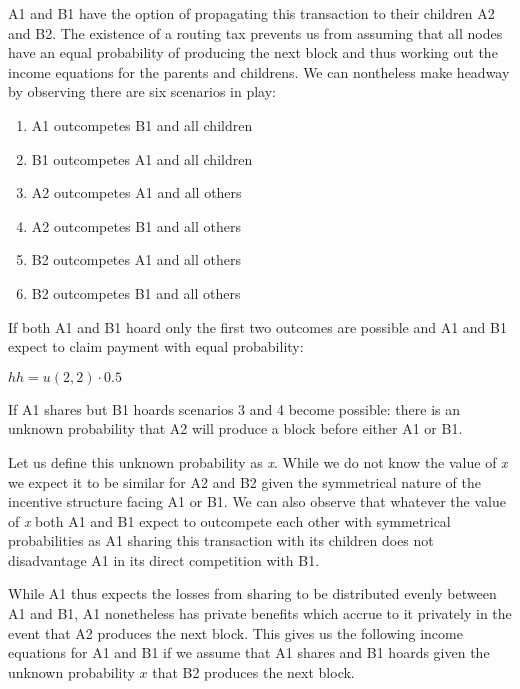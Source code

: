 \documentclass[oneside]{article}   	%
\begin{document}
\begin{multicols}{2}
A1 and B1 have the option of propagating this transaction to their children A2 and B2. The existence of a routing tax prevents us from assuming that all nodes have an equal probability of producing the next block and thus working out the income equations for the parents and childrens. We can nontheless make headway by observing there are six scenarios in play:

\begin{enumerate}
  \item A1 outcompetes B1 and all children
  \item B1 outcompetes A1 and all children
  \item A2 outcompetes A1 and all others
  \item A2 outcompetes B1 and all others
  \item B2 outcompetes A1 and all others
  \item B2 outcompetes B1 and all others
\end{enumerate}

If both A1 and B1 hoard only the first two outcomes are possible and A1 and B1 expect to claim payment with equal probability:

\large
\begin{adjustwidth}{1.5em}{1.5em} 
	\begin{math}
h h = u(2, 2) \cdot 0.5
	\end{math}
\end{adjustwidth}
\normalsize

If A1 shares but B1 hoards scenarios 3 and 4 become possible: there is an unknown probability that A2 will produce a block before either A1 or B1.

Let us define this unknown probability as \textit{x}. While we do not know the value of \textit{x} we expect it to be similar for A2 and B2 given the symmetrical nature of the incentive structure facing A1 or B1. We can also observe that whatever the value of \textit{x} both A1 and B1 expect to outcompete each other with symmetrical probabilities as A1 sharing this transaction with its children does not disadvantage A1 in its direct competition with B1.

While A1 thus expects the losses from sharing to be distributed evenly between A1 and B1, A1 nonetheless has private benefits which accrue to it privately in the event that A2 produces the next block. This gives us the following income equations for A1 and B1 if we assume that A1 shares and B1 hoards given the unknown probability \begin{math}x\end{math} that B2 produces the next block.


\end{multicols}
\end{document}

